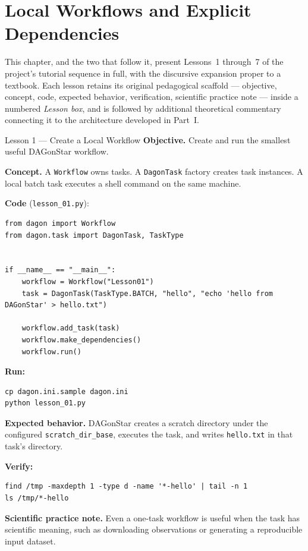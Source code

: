 \chapter{Local Workflows and Explicit Dependencies}
\label{ch:lessons-01-02}

This chapter, and the two that follow it, present Lessons~1 through~7 of the
project's tutorial sequence in full, with the discursive expansion proper to
a textbook. Each lesson retains its original pedagogical scaffold ---
objective, concept, code, expected behavior, verification, scientific
practice note --- inside a numbered \emph{Lesson box}, and is followed by
additional theoretical commentary connecting it to the architecture developed
in Part~I.

\begin{lessonbox}{Lesson 1 --- Create a Local Workflow}
\textbf{Objective.} Create and run the smallest useful DAGonStar workflow.

\textbf{Concept.} A \texttt{Workflow} owns tasks. A \texttt{DagonTask}
factory creates task instances. A local batch task executes a shell command
on the same machine.

\textbf{Code} (\texttt{lesson\_01.py}):
\begin{lstlisting}
from dagon import Workflow
from dagon.task import DagonTask, TaskType


if __name__ == "__main__":
    workflow = Workflow("Lesson01")
    task = DagonTask(TaskType.BATCH, "hello", "echo 'hello from DAGonStar' > hello.txt")

    workflow.add_task(task)
    workflow.make_dependencies()
    workflow.run()
\end{lstlisting}

\textbf{Run:}
\begin{lstlisting}[style=bash]
cp dagon.ini.sample dagon.ini
python lesson_01.py
\end{lstlisting}

\textbf{Expected behavior.} DAGonStar creates a scratch directory under the
configured \texttt{scratch\_dir\_base}, executes the task, and writes
\texttt{hello.txt} in that task's directory.

\textbf{Verify:}
\begin{lstlisting}[style=bash]
find /tmp -maxdepth 1 -type d -name '*-hello' | tail -n 1
ls /tmp/*-hello
\end{lstlisting}

\textbf{Scientific practice note.} Even a one-task workflow is useful when
the task has scientific meaning, such as downloading observations or
generating a reproducible input dataset.
\end{lessonbox}

